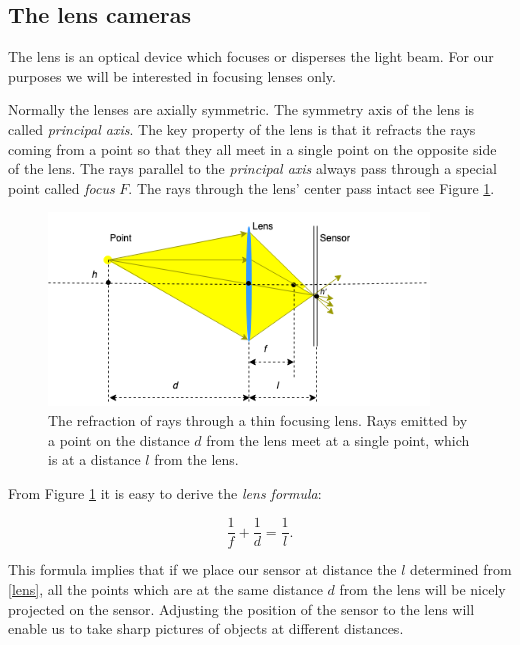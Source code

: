 \documentclass[a4paper,10pt]{article}
\begin{document}
\subsection{The lens cameras}

The lens is an optical device which focuses or disperses the light beam. For our purposes we will be interested in focusing lenses only. 

Normally the lenses are axially symmetric. The symmetry axis of the lens is called  {\it principal axis}. The key property of the lens is that it refracts the rays coming from a point so that they all meet in a single point on the opposite side of the lens. The rays parallel to the {\it principal axis} always pass through a special point called {\it focus} $F$. The rays through the lens' center pass intact see Figure \ref{fig:lens}.

\begin{figure}[h]
\centering
 \includegraphics[width=0.9\textwidth]{../../images/lens.png}
 \caption{The refraction of rays through a thin focusing lens. Rays emitted by a point on the distance $d$ from the lens meet at a single point, which is at a distance $l$ from the lens.}
 \label{fig:lens}
\end{figure}

From Figure \ref{fig:lens} it is easy to derive the {\it lens formula}:

\begin{equation}
 \frac{1}{f} + \frac{1}{d} = \frac{1}{l}.
 \label{lens}
\end{equation}

This formula implies that if we place our sensor at distance the $l$ determined from \eqref{lens}, all the points which are at the same distance $d$ from the lens will be nicely projected on the sensor. Adjusting the position of the sensor to the lens will enable us to take sharp pictures of objects at different distances. 
\end{document}
